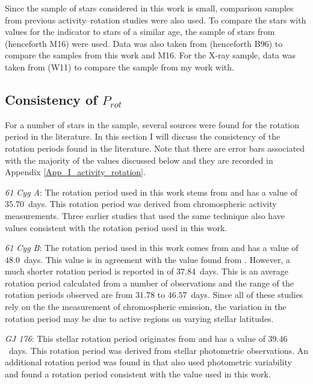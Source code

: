 Since the sample of stars considered in this work is small, comparison samples from previous activity--rotation studies were also used. To compare the stars with values for the \Rprime indicator to stars of a similar age, the sample of stars from \citet{Metcalfe_etal_2016} (henceforth M16) were used. Data was also taken from \citet{Baliunas_etal_1996} (henceforth B96) to compare the \Rprime samples from this work and M16. For the X-ray sample, data was taken from \citet{Wright_etal_2011} (W11) to compare the sample from my work with.

\subsection{Consistency of \texorpdfstring{$P_{rot}$}{Prot}}
For a number of stars in the sample, several sources were found for the rotation period in the literature. In this section I will discuss the consistency of the rotation periods found in the literature. Note that there are error bars associated with the majority of the values discussed below and they are recorded in Appendix \ref{App_I_activity_rotation}.

\textit{61 Cyg A}: The rotation period used in this work stems from \citet{Boro_Saikia_etal_2016} and has a value of $35.70$~days. This rotation period was derived from chromospheric activity measurements. Three earlier studies that used the same technique \citep{Vaughan_etal_1981,Hallam_Wolff_1981,Donahue_etal_1996} also have values consistent with the rotation period used in this work.

\textit{61 Cyg B}: The rotation period used in this work comes from \citet{Vaughan_etal_1981} and has a value of $48.0$~days. This value is in agreement with the value found from \citet{Hallam_Wolff_1981}. However, a much shorter rotation period is reported in \citet{Donahue_etal_1996} of $37.84$~days. This is an average rotation period calculated from a number of observations and the range of the rotation periods observed are from $31.78$ to $46.57$~days. Since all of these studies rely on the the measurement of chromospheric emission, the variation in the rotation period may be due to active regions on varying stellar latitudes.

\textit{GJ 176}: This stellar rotation period originates from \citet{Robertson_etal_2015_GJ176} and has a value of $39.46$~days. This rotation period was derived from stellar photometric observations. An additional rotation period was found in \citet{Kiraga_Stepien_2007} that also used photometric variability and found a rotation period consistent with the value used in this work.

